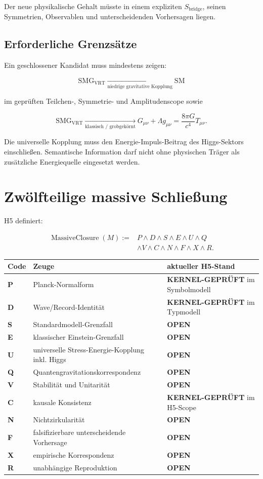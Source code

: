 \documentclass[11pt,a4paper]{article}
\newcommand{\SMGVRT}{\ensuremath{\mathrm{SMG}_{\mathrm{VRT}}}}
\newcommand{\openstatus}{\textcolor{qikred}{\textbf{OPEN}}}
\newcommand{\kernelstatus}{\textcolor{qikgreen}{\textbf{KERNEL-GEPRÜFT}}}
\begin{document}
Der neue physikalische Gehalt müsste in einem expliziten
\(S_{\mathrm{bridge}}\), seinen Symmetrien, Observablen und unterscheidenden
Vorhersagen liegen.

\subsection{Erforderliche Grenzsätze}

Ein geschlossener Kandidat muss mindestens zeigen:

\[
\SMGVRT
\xrightarrow[\text{niedrige gravitative Kopplung}]{}
\mathrm{SM}
\]

im geprüften Teilchen-, Symmetrie- und Amplitudenscope sowie

\[
\SMGVRT
\xrightarrow[\text{klassisch / grobgekörnt}]{}
G_{\mu\nu}+\Lambda g_{\mu\nu}
=\frac{8\pi G}{c^4}T_{\mu\nu}.
\]

Die universelle Kopplung muss den Energie-Impuls-Beitrag des Higgs-Sektors
einschließen. Semantische Information darf nicht ohne physischen Träger als
zusätzliche Energiequelle eingesetzt werden.

\section{Zwölfteilige massive Schließung}

H5 definiert:

\[
\begin{aligned}
\operatorname{MassiveClosure}(M):={}&P\land D\land S\land E\land U\land Q\\
&\land V\land C\land N\land F\land X\land R.
\end{aligned}
\]

\begin{longtable}{>{\bfseries}p{}p{}p{}}
\toprule
Code & Zeuge & aktueller H5-Stand \\
\midrule
\endhead
P & Planck-Normalform & \kernelstatus{} im Symbolmodell \\
D & Wave/Record-Identität & \kernelstatus{} im Typmodell \\
S & Standardmodell-Grenzfall & \openstatus \\
E & klassischer Einstein-Grenzfall & \openstatus \\
U & universelle Stress-Energie-Kopplung inkl. Higgs & \openstatus \\
Q & Quantengravitationskorrespondenz & \openstatus \\
V & Stabilität und Unitarität & \openstatus \\
C & kausale Konsistenz & \kernelstatus{} im H5-Scope \\
N & Nichtzirkularität & \openstatus \\
F & falsifizierbare unterscheidende Vorhersage & \openstatus \\
X & empirische Korrespondenz & \openstatus \\
R & unabhängige Reproduktion & \openstatus \\
\bottomrule
\end{longtable}
\end{document}
